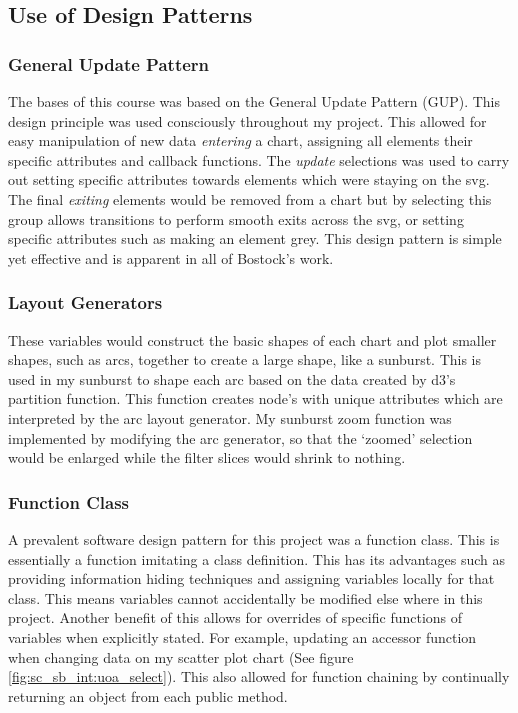 \documentclass[a4paper, 11pt]{article}
\begin{document}
\newpage
\subsection{Use of Design Patterns}

\subsubsection{General Update Pattern}
The bases of this course was based on the General Update Pattern (GUP). This design principle was used consciously throughout my project. This allowed for easy manipulation of new data \textit{entering} a chart, assigning all elements their specific attributes and callback functions. The \textit{update} selections was used to carry out setting specific attributes towards elements which were staying on the svg. The final \textit{exiting} elements would be removed from a chart but by selecting this group allows transitions to perform smooth exits across the svg, or setting specific attributes such as making an element grey. This design pattern is simple yet effective and is apparent in all of Bostock's work.

\subsubsection{Layout Generators}
These variables would construct the basic shapes of each chart and plot smaller shapes, such as arcs, together to create a large shape, like a sunburst. This is used in my sunburst to shape each arc based on the data created by d3's partition function. This function creates node's with unique attributes which are interpreted by the arc layout generator. My sunburst zoom function was implemented by modifying the arc generator, so that the `zoomed' selection would be enlarged while the filter slices would shrink to nothing. 

\subsubsection{Function Class}
A prevalent software design pattern for this project was a function class. This is essentially a function imitating a class definition. This has its advantages such as providing information hiding techniques and assigning variables locally for that class. This means variables cannot accidentally be modified else where in this project. Another benefit of this allows for overrides of specific functions of variables when explicitly stated. For example, updating an accessor function when changing data on my scatter plot chart (See figure \ref{fig:sc_sb_int:uoa_select}). This also allowed for function chaining by continually returning an object from each public method.
\end{document}
